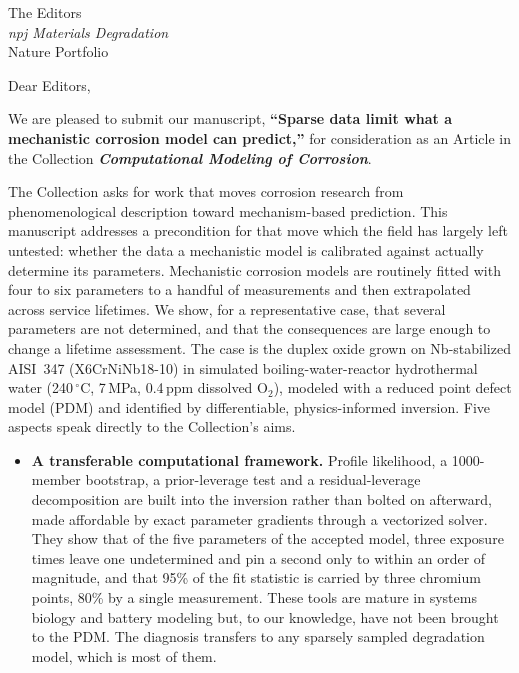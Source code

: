 \documentclass[11pt]{letter}
\begin{document}
\setlength{\parskip}{0.4ex}

\begin{letter}{The Editors \\ \textit{npj Materials Degradation} \\ Nature Portfolio}

\opening{Dear Editors,}

We are pleased to submit our manuscript, \textbf{``Sparse data limit
what a mechanistic corrosion model can predict,''} for consideration as an Article
in the Collection \textbf{\textit{Computational Modeling of
Corrosion}}.

The Collection asks for work that moves corrosion research from
phenomenological description toward mechanism-based prediction. This
manuscript addresses a precondition for that move which the field has
largely left untested: whether the data a mechanistic model is
calibrated against actually determine its parameters. Mechanistic
corrosion models are routinely fitted with four to six parameters to a
handful of measurements and then extrapolated across service lifetimes.
We show, for a representative case, that several parameters are not
determined, and that the consequences are large enough to change a
lifetime assessment. The case is the duplex oxide grown on Nb-stabilized
AISI~347 (X6CrNiNb18-10) in simulated boiling-water-reactor hydrothermal
water (240\,$^\circ$C, 7\,MPa, 0.4\,ppm dissolved O$_2$), modeled with a
reduced point defect model (PDM) and identified by differentiable,
physics-informed inversion. Five aspects speak directly to the
Collection's aims.

\begin{itemize}
\item \textbf{A transferable computational framework.} Profile
likelihood, a 1000-member bootstrap, a prior-leverage test and a
residual-leverage decomposition are built into the inversion rather than
bolted on afterward, made affordable by exact parameter gradients
through a vectorized solver. They show that of the five parameters of
the accepted model, three exposure times leave one undetermined and pin
a second only to within an order of magnitude, and that 95\% of the fit
statistic is carried by three chromium points, 80\% by a single
measurement. These tools are mature in systems biology and battery
modeling but, to our knowledge, have not been brought to the PDM. The
diagnosis transfers to any sparsely sampled degradation model, which is
most of them.


\end{itemize}
\end{letter}
\end{document}
